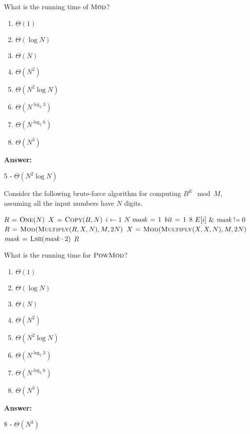 \documentclass[12pt,twoside]{article}
\newcommand{\isnotequal}{\mathrel{\scalebox{0.8}[1]{!}\hspace*{1pt}\scalebox{0.8}[1]{=}}}
\newcommand{\answer}{
 \par\medskip
 \textbf{Answer:}
}
\newcommand{\answerIk}{ \answer
5 - $\Theta(N^2 \log N)$
}
\newcommand{\answerIl}{ \answer
8 - $\Theta(N^3)$
}
\begin{document}
\begin{problems}
\begin{problemparts}
\problempart {} What is the running time of $\textnormal{\scshape Mod}$?
\begin{enumerate}
  \item $\Theta(1)$
  \item $\Theta(\log N)$
  \item $\Theta(N)$
  \item $\Theta(N^2)$
  \item $\Theta(N^2 \log N)$
  \item $\Theta(N^{\log_2 3})$
  \item $\Theta(N^{\log_2 6})$
  \item $\Theta(N^3)$
\end{enumerate}
\answerIk

\end{problemparts}

Consider the following brute-force algorithm for computing $B^E \mod M$,
assuming all the input numbers have $N$ digits.

\begin{codebox}
\li $R \mathrel{\hspace{1pt}=\hspace{1pt}} \textnormal{\scshape One}(N)$ 
\li $X \mathrel{\hspace{1pt}=\hspace{1pt}} \textnormal{\scshape Copy}(B, N)$ 
\li \For $i \gets 1$ \To $N$ \label{li:exp-for1}
\li   \Do
        $\id{mask} \gets 1$
\li     \For $\id{bit} \gets 1$ \To $8$ \label{li:exp-for2}
\li       \Do
            \If $E[i] \textrm{ \& } \id{mask} \isnotequal 0$
\li         \Then
              $R \mathrel{\hspace{1pt}=\hspace{1pt}} \textnormal{\scshape Mod}(\textnormal{\scshape Multiply}(R, X, N), M, 2N)$
              \label{li:exp-mulmod1}
            \End
\li         $X \mathrel{\hspace{1pt}=\hspace{1pt}} \textnormal{\scshape Mod}(\textnormal{\scshape Multiply}(X, X, N), M, 2N)$
            \label{li:exp-mulmod2}
\li         $\id{mask} \gets \proc{Lsb}(\id{mask} \cdot 2)$
          \End
      \End
\li \Return $R$
\end{codebox}

\begin{problemparts}

\problempart {} What is the running time for $\textnormal{\scshape PowMod}$?
\begin{enumerate}
  \item $\Theta(1)$
  \item $\Theta(\log N)$
  \item $\Theta(N)$
  \item $\Theta(N^2)$
  \item $\Theta(N^2 \log N)$
  \item $\Theta(N^{\log_2 3})$
  \item $\Theta(N^{\log_2 6})$
  \item $\Theta(N^3)$
\end{enumerate}
\answerIl


\end{problemparts}
\end{problems}
\end{document}
